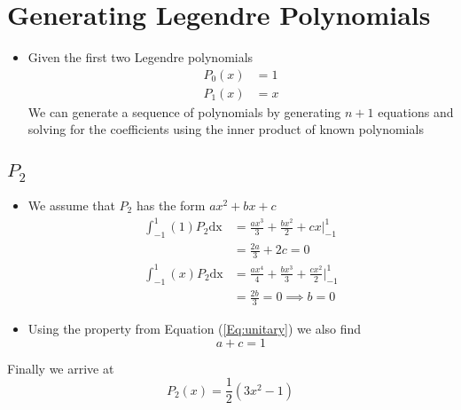 \documentclass{article}
\begin{document}
    \section{Generating Legendre Polynomials}
    \begin{itemize}
        \item Given the first two Legendre polynomials
            \begin{align}
                P_0(x) &= 1\\
                P_1(x) &= x
            \end{align}
            We can generate a sequence of polynomials by generating $n+1$ equations and solving for the coefficients using the inner product of known polynomials
    \end{itemize}
    \begin{leftbar}
        \subsection{$P_2$}
        \begin{itemize}
            \item We assume that $P_2$ has the form $ax^2+bx+c$
                \begin{align}
                    \int_{-1}^{1} (1)P_2 \mathrm{dx} &= \frac{ax^3}{3}+\frac{bx^2}{2}+cx\bigg|_{-1}^{1}\\
                    &= \frac{2a}{3}+2c = 0 \\
                    \int_{-1}^{1} (x)P_2 \mathrm{dx} &= \frac{ax^4}{4}+\frac{bx^3}{3}+\frac{cx^2}{2}\bigg|_{-1}^{1} \\
                    &= \frac{2b}{3} = 0 \implies b = 0
                \end{align}
            \item Using the property from Equation (\ref{Eq:unitary}) we also find
                \begin{equation}
                    a+c=1
                \end{equation}
        \end{itemize}
        Finally we arrive at
        \begin{equation}
            P_2(x) = \frac{1}{2}(3x^2-1)
        \end{equation}
    \end{leftbar}
\end{document}
